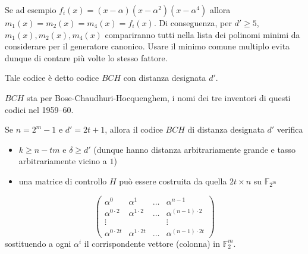 Se ad esempio \(f_i(x) = (x-\alpha)(x-\alpha^2)(x-\alpha^4)\) allora \(m_1(x) = m_2(x) = m_4(x) = f_i(x)\). Di conseguenza, per \(d' \geq 5\), \(m_1(x), m_2(x), m_4(x)\) compariranno tutti nella lista dei polinomi minimi da considerare per il generatore canonico.
Usare il minimo comune multiplo evita dunque di contare più volte lo stesso fattore.

Tale codice è detto codice \(BCH\) con distanza designata \(d'\).

\begin{note}{}
  \(BCH\) sta per Bose-Chaudhuri-Hocquenghem, i nomi dei tre inventori di questi codici nel 1959--60.
\end{note}

\begin{theorem}{}
  Se \(n = 2^m-1\) e \(d' = 2t+1\), allora il codice \(BCH\) di distanza designata \(d'\) verifica
  \begin{itemize}
    \item \(k\geq n-tm\) e \(\delta \geq d'\) (dunque hanno distanza arbitrariamente grande e tasso arbitrariamente vicino a \(1\))
    \item una matrice di controllo \(H\) può essere costruita da quella \(2t\times n\) su \(\mathbb{F}_{2^m}\)
  \end{itemize}
  \[\begin{pmatrix}
    \alpha^0 & \alpha^1 &\ldots &\alpha^{n-1}\\
    \alpha^{0\cdot 2} & \alpha^{1\cdot 2} &\ldots &\alpha^{(n-1)\cdot 2}\\
    \vdots & & & \vdots \\
    \alpha^{0\cdot 2t} & \alpha^{1\cdot 2t} &\ldots &\alpha^{(n-1)\cdot 2t}
  \end{pmatrix}\]
  sostituendo a ogni \(\alpha^i\) il corrispondente vettore (colonna) in \(\mathbb{F}_2^m\).
\end{theorem}

